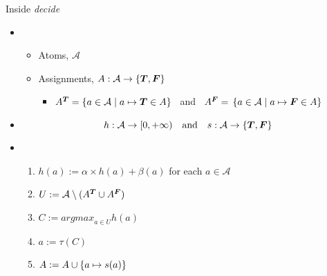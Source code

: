 \documentclass[t]{beamer}
\renewcommand{\Tsigned}[1]{\ensuremath{{#1}\mapsto\true}} %
\renewcommand{\Fsigned}[1]{\ensuremath{{#1}\mapsto\false}} %
\begin{document}
\begin{frame}{Inside \alert<1>{\textit{decide}}}
  \bigskip
  \begin{itemize}
  \item<2-> 
    \begin{itemize}
    \item Atoms, $\mathcal{A}$
    \item Assignments, $A: \mathcal{A}\to\{\boldsymbol{T},\boldsymbol{F}\}$
      \begin{itemize}
      \item[]
        $\tlits{\ass}=\{a\in\mathcal{A}\mid\Tsigned{a}\in\ass\}$ \ and \
        $\flits{\ass}=\,\{a\in\mathcal{A}\mid\Fsigned{a}\in\ass\}$
      \end{itemize}
    \end{itemize}
  \item<3-> 
    \[
    h: \mathcal{A}\to[0,+\infty)
    \quad\text{and}\quad
    s: \mathcal{A}\to\{\boldsymbol{T},\boldsymbol{F}\}
    \]
  \item<4-> 
  \medskip
    \begin{enumerate}
    \item $h(a) := \alpha\times h(a) + \beta(a)$ \hfill for each $a\in\mathcal{A}\qquad$
    \item $U:=\mathcal{A}\setminus ({A}^{\boldsymbol{T}}\cup{\ensuremath{A}}^{\boldsymbol{F}})$
    \item $C:= \textit{argmax}_{a\in U}h(a)$
    \item $a:= \tau(C)$
    \item $A := A\cup\{a\mapsto s(a)\}$
    \end{enumerate}
  \end{itemize}
\end{frame}
\end{document}
